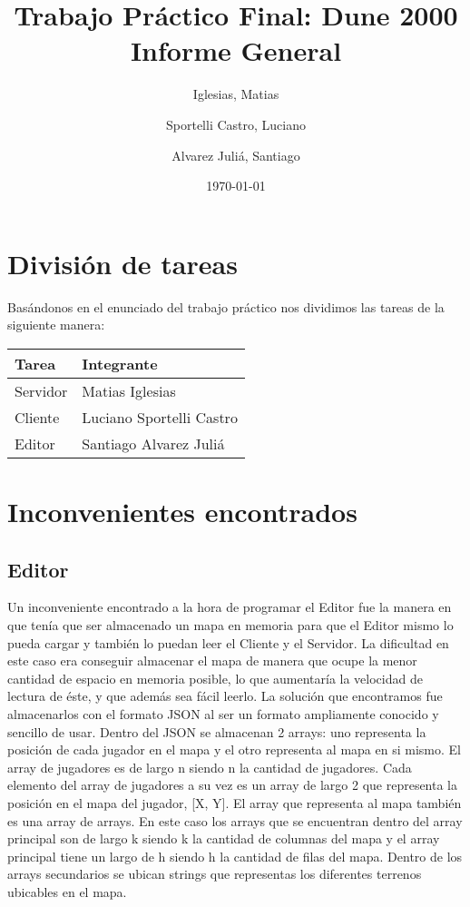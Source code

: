\documentclass[titlepage,a4paper,12pt]{article}
\title{ Trabajo Práctico Final: Dune 2000 \\
 \large{Informe General}}
\author{Iglesias, Matias \and Sportelli Castro, Luciano \and Alvarez Juliá, Santiago}
\date{ \today }
\begin{document}
\maketitle

\tableofcontents %

\newpage
\section{División de tareas}

Basándonos en el enunciado del trabajo práctico nos dividimos las tareas de la siguiente manera:\\

\begin{center}
    \begin{tabular}{ | l | l |}
    \hline
    Tarea & Integrante \\ \hline
    Servidor & Matias Iglesias  \\ \hline
    Cliente & Luciano Sportelli Castro \\ \hline
    Editor & Santiago Alvarez Juliá \\
    \hline
    \end{tabular}
\end{center}

\section{Inconvenientes encontrados}

\subsection{Editor}

Un inconveniente encontrado a la hora de programar el Editor fue la manera en que tenía que ser almacenado un mapa en memoria para que el Editor mismo lo pueda cargar y también lo puedan leer el Cliente y el Servidor. La dificultad en este caso era conseguir almacenar el mapa de manera que ocupe la menor cantidad de espacio en memoria posible, lo que aumentaría la velocidad de lectura de éste, y que además sea fácil leerlo. La solución que encontramos fue almacenarlos con el formato JSON al ser un formato ampliamente conocido y sencillo de usar. Dentro del JSON se almacenan 2 arrays: uno representa la posición de cada jugador en el mapa y el otro representa al mapa en si mismo. El array de jugadores es de largo n siendo n la cantidad de jugadores. Cada elemento del array de jugadores a su vez es un array de largo 2 que representa la posición en el mapa del jugador, [X, Y]. El array que representa al mapa también es una array de arrays. En este caso los arrays que se encuentran dentro del array principal son de largo k siendo k la cantidad de columnas del mapa y el array principal tiene un largo de h siendo h la cantidad de filas del mapa. Dentro de los arrays secundarios se ubican strings que representas los diferentes terrenos ubicables en el mapa.
\end{document}
